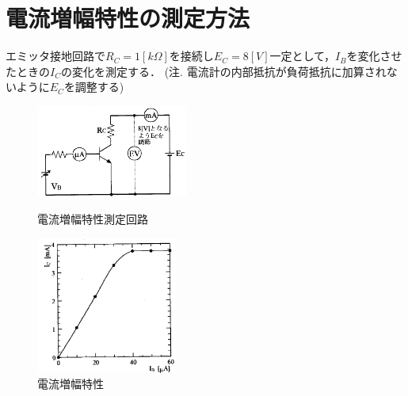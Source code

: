 \documentclass[10pt, a4j, dvipdfmx]{jarticle}
\begin{document}
    \section*{電流増幅特性の測定方法}
    エミッタ接地回路で$R_C = 1[k\Omega]$を接続し$E_C = 8[V]$一定として，$I_B$を変化させたときの$I_C$の変化を測定する．
    \small (注. 電流計の内部抵抗が負荷抵抗に加算されないように$E_C$を調整する)
    \begin{figure}[H]
        \begin{minipage}{0.5\hsize}
            \centering
            \includegraphics[width=50mm]{fig-5.png}
            \caption{電流増幅特性測定回路}
            \label{fig:5}
        \end{minipage}
        \begin{minipage}{0.5\hsize}
            \centering
            \includegraphics[height=45mm]{fig-6.png}
            \caption{電流増幅特性}
            \label{fig:6}
        \end{minipage}
    \end{figure}
\end{document}
